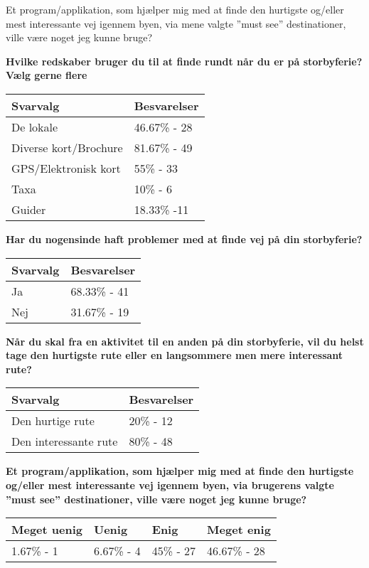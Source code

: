 Et program/applikation, som hjælper mig med at finde den hurtigste og/eller mest interessante vej igennem byen, via mene valgte ”must see” destinationer, ville være noget jeg kunne bruge? \newline


\textbf{Hvilke redskaber bruger du til at finde rundt når du er på storbyferie?
Vælg gerne flere}

	\begin{tabular}{| l | l |}
	\hline
	Svarvalg & Besvarelser \\ \hline
	De lokale & 46.67\% - 28 \\ \hline
	Diverse kort/Brochure & 81.67\% - 49 \\ \hline
	GPS/Elektronisk kort & 55\% - 33 \\ \hline
	Taxa & 10\% - 6 \\ \hline
	Guider & 18.33\% -11 \\
	\hline
	\end{tabular}
\newline
\newline 	


\textbf{Har du nogensinde haft problemer med at finde vej på din storbyferie?}

	\begin{tabular}{| l | l |}
	\hline
	Svarvalg & Besvarelser \\ \hline
	Ja & 68.33\% - 41 \\ \hline
	Nej & 31.67\% - 19 \\
	\hline
	\end{tabular}
\newline
\newline

\textbf{Når du skal fra en aktivitet til en anden på din storbyferie, vil du helst tage den hurtigste rute eller en langsommere men mere interessant rute?}

	\begin{tabular}{| l | l |}
	\hline
	Svarvalg & Besvarelser \\ \hline
	Den hurtige rute & 20\% - 12 \\ \hline
	Den interessante rute & 80\% - 48 \\
	\hline
	\end{tabular}
\newline
\newline

\textbf{Et program/applikation, som hjælper mig med at finde den hurtigste og/eller mest interessante vej igennem byen, via brugerens valgte ”must see” destinationer, ville være noget jeg kunne bruge?}

	\begin{tabular}{| l | l | l | l |}
    \hline
    Meget uenig & Uenig & Enig & Meget enig \\ \hline
    1.67\% - 1 & 6.67\% - 4 & 45\% - 27 & 46.67\% - 28 \\
    \hline
    \end{tabular}
